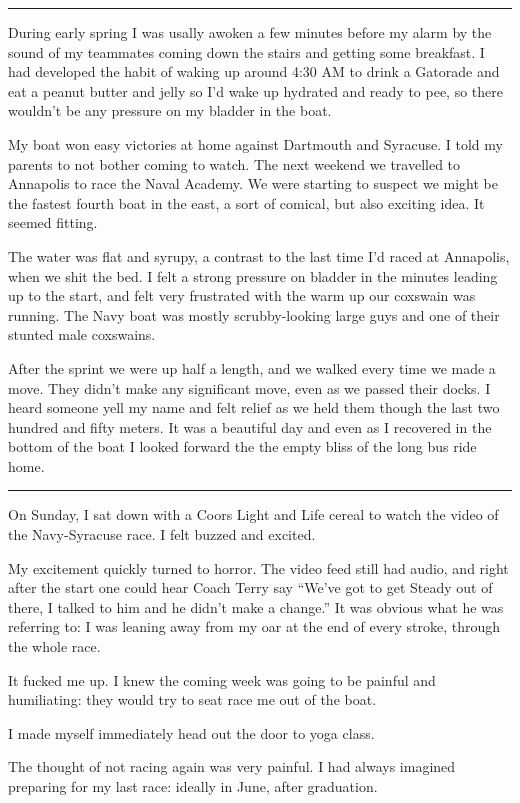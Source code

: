 \plainfancybreak{12pt}{2}{* * *}

During early spring I was usally awoken a few minutes before my alarm by the
sound of my teammates coming down the stairs and getting some breakfast.  I had
developed the habit of waking up around 4:30 AM to drink a Gatorade and eat a
peanut butter and jelly so I'd wake up hydrated and ready to pee, so there
wouldn't be any pressure on my bladder in the boat. 

My boat won easy victories at home against Dartmouth and Syracuse.  I told my
parents to not bother coming to watch.  The next weekend we travelled to
Annapolis to race the Naval Academy.  We were starting to suspect we might be
the fastest fourth boat in the east, a sort of comical, but also exciting idea.
It seemed fitting.  

The water was flat and syrupy, a contrast to the last time I'd raced at
Annapolis, when we shit the bed.  I felt a strong pressure on bladder in the
minutes leading up to the start, and felt very frustrated with the warm up our
coxswain was running.  The Navy boat was mostly scrubby-looking large guys and
one of their stunted male coxswains.

After the sprint we were up half a length, and we walked every time we made a
move.  They didn't make any significant move, even as we passed their docks.  I
heard someone yell my name and felt relief as we held them though the last
two hundred and fifty meters.  It was a beautiful day and even as I recovered in
the bottom of the boat I looked forward the the empty bliss of the long bus ride
home.

\plainfancybreak{12pt}{2}{* * *}

On Sunday, I sat down with a Coors Light and Life cereal to watch the video of
the Navy-Syracuse race.  I felt buzzed and excited. 

My excitement quickly turned to horror.  The video feed still had audio, and
right after the start one could hear Coach Terry say ``We've got to get Steady
out of there, I talked to him and he didn't make a change.''  It was obvious
what he was referring to: I was leaning away from my oar at the end of every
stroke, through the whole race.

It fucked me up.  I knew the coming week was going to be painful and
humiliating: they would try to seat race me out of the boat.

I made myself immediately head out the door to yoga class.  

The thought of not racing again was very painful.  I had always imagined
preparing for my last race: ideally in June, after graduation.

